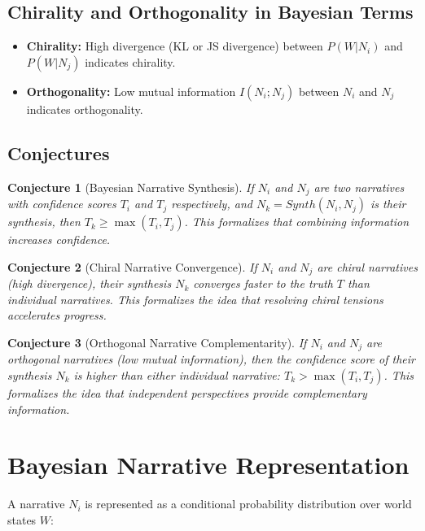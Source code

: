 \documentclass[12pt, a4paper]{article}
\newtheorem{conjecture}{Conjecture}
\begin{document}
\subsection{Chirality and Orthogonality in Bayesian Terms}

\begin{itemize}
    \item \textbf{Chirality:}  High divergence (KL or JS divergence) between $P(W|N_i)$ and $P(W|N_j)$ indicates chirality.
    \item \textbf{Orthogonality:} Low mutual information $I(N_i; N_j)$ between $N_i$ and $N_j$ indicates orthogonality.
\end{itemize}

\subsection{Conjectures}

\begin{conjecture}[Bayesian Narrative Synthesis]
If $N_i$ and $N_j$ are two narratives with confidence scores $T_i$ and $T_j$ respectively, and $N_k = Synth(N_i, N_j)$ is their synthesis, then $T_k \ge \max(T_i, T_j)$. This formalizes that combining information increases confidence.
\end{conjecture}

\begin{conjecture}[Chiral Narrative Convergence]
If $N_i$ and $N_j$ are chiral narratives (high divergence), their synthesis $N_k$ converges faster to the truth $T$ than individual narratives. This formalizes the idea that resolving chiral tensions accelerates progress.
\end{conjecture}

\begin{conjecture}[Orthogonal Narrative Complementarity]
If $N_i$ and $N_j$ are orthogonal narratives (low mutual information), then the confidence score of their synthesis $N_k$ is higher than either individual narrative: $T_k > \max(T_i, T_j)$. This formalizes the idea that independent perspectives provide complementary information.
\end{conjecture}

\section{Bayesian Narrative Representation}

A narrative $N_i$ is represented as a conditional probability distribution over world states $W$:
\end{document}
